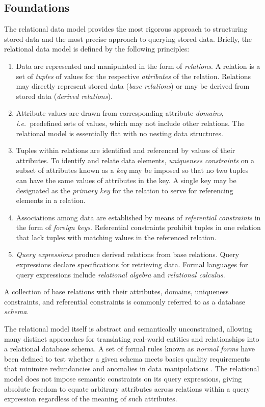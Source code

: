 \documentclass[letter,twocolumn,10pt]{article}
\begin{document}
\subsection{Foundations}
The relational data model \citep{codd_relational_1970} provides the most rigorous approach to structuring stored data and the most precise approach to querying stored data.  
Briefly, the relational data model is defined by the following principles:
\begin{enumerate}
\item Data are represented and manipulated in the form of \emph{relations}. 
A relation is a set of \emph{tuples} of values for the respective \emph{attributes} of the relation.
Relations may directly represent stored data (\emph{base relations}) or may be derived from stored data (\emph{derived relations}).
\item Attribute values are drawn from corresponding attribute \emph{domains}, \emph{i.e.}\ predefined sets of values, which may not include other relations.
The relational model is essentially flat with no nesting data structures.
\item Tuples within relations are identified and referenced by values of their attributes.
To identify and relate data elements, \emph{uniqueness constraints} on a subset of attributes known as a \emph{key} may be imposed so that no two tuples can have the same values of attributes in the key. A single key may be designated as the \emph{primary key} for the relation to serve for referencing elements in a relation.
\item Associations among data are established by means of \emph{referential constraints} in the form of \emph{foreign keys}. 
Referential constraints prohibit tuples in one relation that lack tuples with matching values in the referenced relation. 
\item \emph{Query expressions} produce derived relations from base relations.  Query expressions declare specifications for retrieving data.
Formal languages for query expressions include \emph{relational algebra} and \emph{relational calculus}.  
\end{enumerate}

A collection of base relations with their attributes, domains, uniqueness constraints, and referential constraints is commonly referred to as a database \emph{schema}.

The relational model itself is abstract and semantically unconstrained, allowing many distinct approaches for translating real-world entities and relationships into a relational database schema. 
A set of formal rules known as \emph{normal forms} have been defined to test whether a given schema meets basics quality requirements that minimize redundancies and anomalies in data manipulations \citep{kent-1983-simple}.
The relational model does not impose semantic constraints on its query expressions, giving absolute freedom to equate arbitrary attributes across relations within a query expression regardless of the meaning of such attributes.
\end{document}
